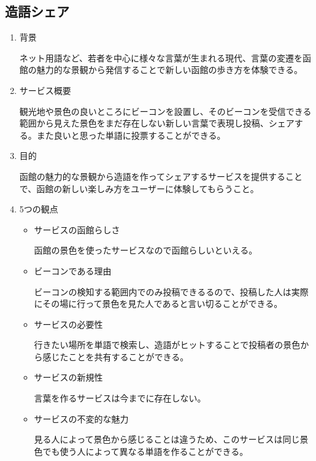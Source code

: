 \subsection{造語シェア}
\begin{enumerate}
    \item 背景
    \par ネット用語など、若者を中心に様々な言葉が生まれる現代、言葉の変遷を函館の魅力的な景観から発信することで新しい函館の歩き方を体験できる。
    \item サービス概要
    \par 観光地や景色の良いところにビーコンを設置し、そのビーコンを受信できる範囲から見えた景色をまだ存在しない新しい言葉で表現し投稿、シェアする。また良いと思った単語に投票することができる。
    \item 目的
    \par 函館の魅力的な景観から造語を作ってシェアするサービスを提供することで、函館の新しい楽しみ方をユーザーに体験してもらうこと。
    \item 5つの観点
    \begin{itemize}
        \item サービスの函館らしさ
        \par 函館の景色を使ったサービスなので函館らしいといえる。
        \item ビーコンである理由
        \par ビーコンの検知する範囲内でのみ投稿できるるので、投稿した人は実際にその場に行って景色を見た人であると言い切ることができる。
        \item サービスの必要性
        \par 行きたい場所を単語で検索し、造語がヒットすることで投稿者の景色から感じたことを共有することができる。
        \item サービスの新規性
        \par 言葉を作るサービスは今までに存在しない。
        \item サービスの不変的な魅力
        \par 見る人によって景色から感じることは違うため、このサービスは同じ景色でも使う人によって異なる単語を作ることができる。
    \end{itemize}
\end{enumerate}

